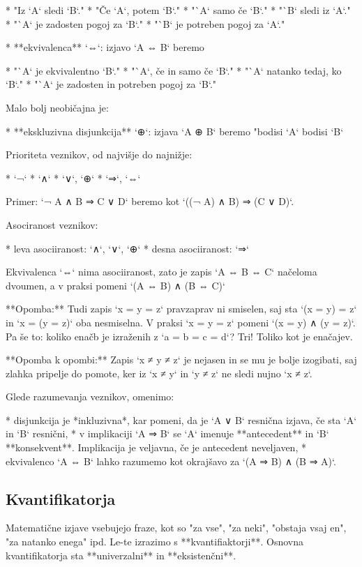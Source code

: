    * "Iz `A` sledi `B`."
   * "Če `A`, potem `B`."
   * "`A` samo če `B`."
   * "`B` sledi iz `A`."
   * "`A` je zadosten pogoj za `B`."
   * "`B` je potreben pogoj za `A`."

* **ekvivalenca** `⇔`: izjavo `A ⇔ B` beremo

   * "`A` je ekvivalentno `B`."
   * "`A`, če in samo če `B`."
   * "`A` natanko tedaj, ko `B`."
   * "`A` je zadosten in potreben pogoj za `B`."

Malo bolj neobičajna je:

* **ekskluzivna disjunkcija** `⊕`: izjava `A ⊕ B` beremo "bodisi `A` bodisi `B`

Prioriteta veznikov, od najvišje do najnižje:

* `¬`
* `∧`
* `∨`, `⊕`
* `⇒`, `⇔`

Primer: `¬ A ∧ B ⇒ C ∨ D` beremo kot `((¬ A) ∧ B) ⇒ (C ∨ D)`.

Asociranost veznikov:

* leva asociiranost: `∧`, `∨`, `⊕`
* desna asociiranost: `⇒`

Ekvivalenca `⇔` nima asociiranost, zato je zapis `A ⇔ B ⇔ C` načeloma dvoumen, a v praksi pomeni `(A ⇔ B) ∧ (B ⇔ C)`

**Opomba:** Tudi zapis `x = y = z` pravzaprav ni smiselen, saj sta `(x = y) = z` in `x = (y = z)` oba nesmiselna. V
praksi `x = y = z` pomeni `(x = y) ∧ (y = z)`. Pa še to: koliko enačb je izraženih z `a = b = c = d`? Tri! Toliko kot je
enačajev.

**Opomba k opombi:** Zapis `x ≠ y ≠ z` je nejasen in se mu je bolje izogibati, saj zlahka pripelje do pomote, ker iz `x
≠ y` in `y ≠ z` ne sledi nujno `x ≠ z`.

Glede razumevanja veznikov, omenimo:

* disjunkcija je *inkluzivna*, kar pomeni, da je `A ∨ B` resnična izjava, če sta `A` in `B` resnični,
* v implikaciji `A ⇒ B` se `A` imenuje **antecedent** in `B` **konsekvent**. Implikacija je veljavna, če je antecedent neveljaven,
* ekvivalenco `A ⇔ B` lahko razumemo kot okrajšavo za `(A ⇒ B) ∧ (B ⇒ A)`.


\subsection{Kvantifikatorja}

Matematične izjave vsebujejo fraze, kot so "za vse", "za neki", "obstaja vsaj en", "za natanko enega" ipd. Le-te izrazimo s **kvantifiaktorji**. Osnovna kvantifikatorja sta **univerzalni** in **eksistenčni**.


